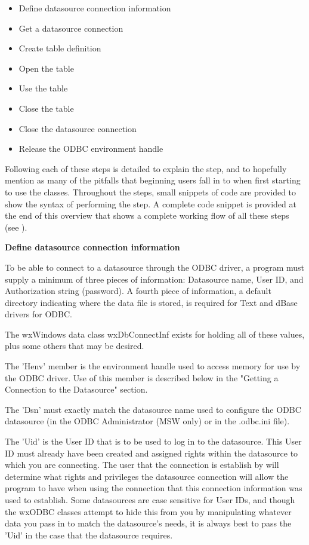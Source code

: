 \begin{itemize}\itemsep=0pt
\item Define datasource connection information
\item Get a datasource connection
\item Create table definition
\item Open the table
\item Use the table
\item Close the table
\item Close the datasource connection
\item Release the ODBC environment handle
\end{itemize}

Following each of these steps is detailed to explain the step, and to 
hopefully mention as many of the pitfalls that beginning users fall in 
to when first starting to use the classes. Throughout the steps, small 
snippets of code are provided to show the syntax of performing the step. A 
complete code snippet is provided at the end of this overview that shows a 
complete working flow of all these steps (see 
).

{\bf Define datasource connection information}

To be able to connect to a datasource through the ODBC driver, a program must 
supply a minimum of three pieces of information: Datasource name, User ID, and 
Authorization string (password). A fourth piece of information, a default 
directory indicating where the data file is stored, is required for Text and 
dBase drivers for ODBC.

The wxWindows data class wxDbConnectInf exists for holding all of these 
values, plus some others that may be desired.

The 'Henv' member is the environment handle used to access memory for use by the 
ODBC driver. Use of this member is described below in the "Getting a Connection 
to the Datasource" section.

The 'Dsn' must exactly match the datasource name used to configure the ODBC 
datasource (in the ODBC Administrator (MSW only) or in the .odbc.ini file).

The 'Uid' is the User ID that is to be used to log in to the datasource. This 
User ID must already have been created and assigned rights within the 
datasource to which you are connecting. The user that the connection is 
establish by will determine what rights and privileges the datasource 
connection will allow the program to have when using the connection that 
this connection information was used to establish. Some datasources are 
case sensitive for User IDs, and though the wxODBC classes attempt to hide 
this from you by manipulating whatever data you pass in to match the 
datasource's needs, it is always best to pass the 'Uid' in the case that 
the datasource requires.

